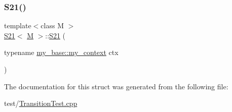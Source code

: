 \subsubsection{\texorpdfstring{S21()}{S21()}}
{\footnotesize\ttfamily template$<$class M $>$ \\
\mbox{\hyperlink{struct_s21}{S21}}$<$ \mbox{\hyperlink{struct_m}{M}} $>$\+::\mbox{\hyperlink{struct_s21}{S21}} (\begin{DoxyParamCaption}\item[{typename \mbox{\hyperlink{struct_orthogonal1_a8cee9db1dad468ee5f8e34871d7a4ae2}{my\+\_\+base\+::my\+\_\+context}}}]{ctx }\end{DoxyParamCaption})\hspace{0.3cm}{\ttfamily [inline]}}



The documentation for this struct was generated from the following file\+:\begin{DoxyCompactItemize}
\item 
test/\mbox{\hyperlink{_transition_test_8cpp}{Transition\+Test.\+cpp}}\end{DoxyCompactItemize}
